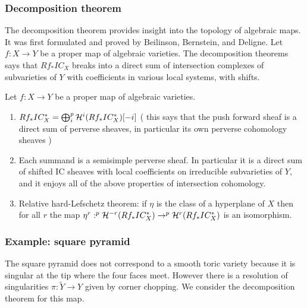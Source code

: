 \documentclass[12pt]{article}
\begin{document}
\subsubsection{Decomposition theorem}
The decomposition theorem provides insight into the topology of algebraic maps. It was first formulated and proved by Beilinson, Bernstein, and Deligne. Let $f:X\to Y$ be a proper map of algebraic varieties. The decomposition theorems says that
$Rf_*IC_X$ breaks into a direct sum of intersection complexes of subvarieties of $Y$
with coefficients in various local systems, with shifts.

\begin{theorem}
     Let $f:X\to Y$ be a proper map of algebraic varieties.
    \begin{enumerate}
        \item $Rf_*IC^*_X = \bigoplus_i ^p {\mathcal{H}}^i(Rf_*IC^*_X)[-i]$ (
              this says that the push forward sheaf is a direct sum of perverse sheaves,
              in particular its own perverse cohomology sheaves
              )
        \item Each summand is a semisimple perverse sheaf. In particular it is
              a direct sum of shifted IC sheaves with local coefficients on irreducible
              subvarieties of $Y$, and it enjoys all of the above properties of intersection
              cohomology.
        \item Relative hard-Lefschetz theorem: if $\eta$ is the class of a hyperplane of
              $X$ then for all $r$ the map $\eta^r:^p{\mathcal{H}}^{-r}(Rf_*IC^*_X) \to ^p{\mathcal{H}}^{r}(Rf_*IC^*_X)$
              is an isomorphism.
    \end{enumerate}
\end{theorem}

\subsubsection{Example: square pyramid}
The square pyramid does not correspond to a smooth toric variety because it is singular
at the tip where the four faces meet. However there is a resolution of singularities
$\pi:\tilde Y\to Y$ given by corner chopping. We consider the decomposition theorem for this
map.
\end{document}
